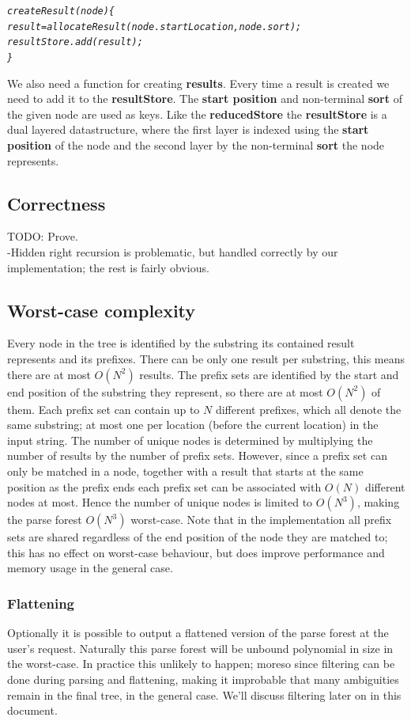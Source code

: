 \documentclass[a4paper,10pt]{article}
\begin{document}
{\small
\begin{alltt}
\textit{createResult(node)\{
  result = allocateResult(node.startLocation, node.sort);
  resultStore.add(result);
\}}
\end{alltt}
}

We also need a function for creating {\bf results}. Every time a result is created we need to add it to the {\bf resultStore}. The {\bf start position} and non-terminal {\bf sort} of the given node are used as keys. Like the {\bf reducedStore} the {\bf resultStore} is a dual layered datastructure, where the first layer is indexed using the {\bf start position} of the node and the second layer by the non-terminal {\bf sort} the node represents.

\subsection{Correctness}

TODO: Prove.\\
-Hidden right recursion is problematic, but handled correctly by our implementation; the rest is fairly obvious.

\subsection{Worst-case complexity}
Every node in the tree is identified by the substring its contained result represents and its prefixes. There can be only one result per substring, this means there are at most $O(N^2)$ results. The prefix sets are identified by the start and end position of the substring they represent, so there are at most $O(N^2)$ of them. Each prefix set can contain up to $N$ different prefixes, which all denote the same substring; at most one per location (before the current location) in the input string. The number of unique nodes is determined by multiplying the number of results by the number of prefix sets. However, since a prefix set can only be matched in a node, together with a result that starts at the same position as the prefix ends each prefix set can be associated with $O(N)$ different nodes at most. Hence the number of unique nodes is limited to $O(N^3)$, making the parse forest $O(N^3)$ worst-case. Note that in the implementation all prefix sets are shared regardless of the end position of the node they are matched to; this has no effect on worst-case behaviour, but does improve performance and memory usage in the general case.

\subsubsection{Flattening}
Optionally it is possible to output a flattened version of the parse forest at the user's request. Naturally this parse forest will be unbound polynomial in size in the worst-case. In practice this unlikely to happen; moreso since filtering can be done during parsing and flattening, making it improbable that many ambiguities remain in the final tree, in the general case. We'll discuss filtering later on in this document.
\end{document}
